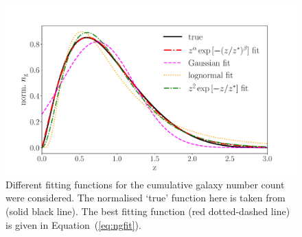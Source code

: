 \documentclass[useAMS,usenatbib]{mnras}
\begin{document}
\begin{figure}
\centering\includegraphics[width=1.0\columnwidth]{GaussVSlognorm_fit_dndz.pdf}
\caption{Different fitting functions for the cumulative galaxy number count were considered. The normalised `true' function here is taken from \citet{0004-637X-814-2-145} (solid black line). The best fitting function (red dotted-dashed line) is given in Equation~(\ref{eq:ngfit}).}
\captionsetup{width=.9\linewidth}
\label{fig:ngfits}
\end{figure}
\end{document}
